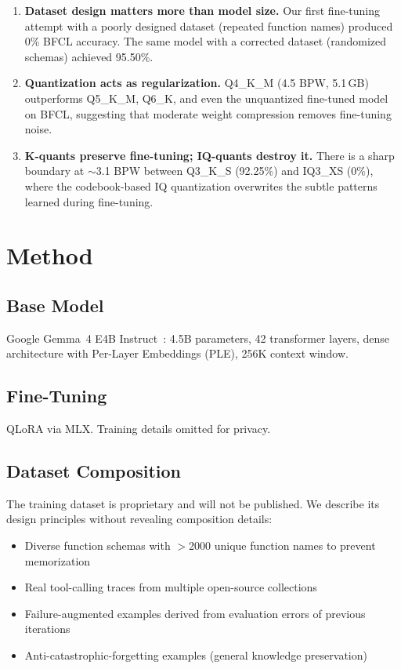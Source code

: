 \documentclass[11pt,a4paper]{article}
\begin{document}
\begin{enumerate}
\item \textbf{Dataset design matters more than model size.} Our first fine-tuning attempt with a poorly designed dataset (repeated function names) produced 0\% BFCL accuracy. The same model with a corrected dataset (randomized schemas) achieved 95.50\%.

\item \textbf{Quantization acts as regularization.} Q4\_K\_M (4.5 BPW, 5.1\,GB) outperforms Q5\_K\_M, Q6\_K, and even the unquantized fine-tuned model on BFCL, suggesting that moderate weight compression removes fine-tuning noise.

\item \textbf{K-quants preserve fine-tuning; IQ-quants destroy it.} There is a sharp boundary at $\sim$3.1 BPW between Q3\_K\_S (92.25\%) and IQ3\_XS (0\%), where the codebook-based IQ quantization overwrites the subtle patterns learned during fine-tuning.
\end{enumerate}

\section{Method}

\subsection{Base Model}

Google Gemma~4 E4B Instruct~\citep{gemma4}: 4.5B parameters, 42 transformer layers, dense architecture with Per-Layer Embeddings (PLE), 256K context window.

\subsection{Fine-Tuning}

QLoRA via MLX. Training details omitted for privacy.

\subsection{Dataset Composition}

The training dataset is proprietary and will not be published. We describe its design principles without revealing composition details:

\begin{itemize}
\item Diverse function schemas with $>$2000 unique function names to prevent memorization
\item Real tool-calling traces from multiple open-source collections
\item Failure-augmented examples derived from evaluation errors of previous iterations
\item Anti-catastrophic-forgetting examples (general knowledge preservation)
\end{itemize}
\end{document}
